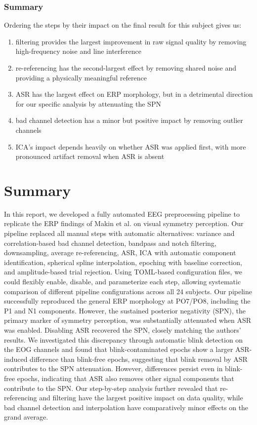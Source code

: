 \documentclass{scrartcl}
\begin{document}
\subsubsection{Summary}
Ordering the steps by their impact on the final result for this subject gives us:
\begin{enumerate}
    \item filtering provides the largest improvement in raw signal quality by removing high-frequency noise and line interference
    \item re-referencing has the second-largest effect by removing shared noise and providing a physically meaningful reference
    \item ASR has the largest effect on ERP morphology, but in a detrimental direction for our specific analysis by attenuating the SPN
    \item bad channel detection has a minor but positive impact by removing outlier channels
    \item ICA's impact depends heavily on whether ASR was applied first, with more pronounced artifact removal when ASR is absent
\end{enumerate}



\section{Summary}
In this report, we developed a fully automated EEG preprocessing pipeline to replicate the ERP findings of Makin et al. \cite{paper} on visual symmetry perception. Our pipeline replaced all manual steps with automatic alternatives: variance and correlation-based bad channel detection, bandpass and notch filtering, downsampling, average re-referencing, ASR, ICA with automatic component identification, spherical spline interpolation, epoching with baseline correction, and amplitude-based trial rejection. Using TOML-based configuration files, we could flexibly enable, disable, and parameterize each step, allowing systematic comparison of different pipeline configurations across all 24 subjects.
Our pipeline successfully reproduced the general ERP morphology at PO7/PO8, including the P1 and N1 components. However, the sustained posterior negativity (SPN), the primary marker of symmetry perception, was substantially attenuated when ASR was enabled. Disabling ASR recovered the SPN, closely matching the authors' results. We investigated this discrepancy through automatic blink detection on the EOG channels and found that blink-contaminated epochs show a larger ASR-induced difference than blink-free epochs, suggesting that blink removal by ASR contributes to the SPN attenuation. However, differences persist even in blink-free epochs, indicating that ASR also removes other signal components that contribute to the SPN. Our step-by-step analysis further revealed that re-referencing and filtering have the largest positive impact on data quality, while bad channel detection and interpolation have comparatively minor effects on the grand average.
\end{document}
